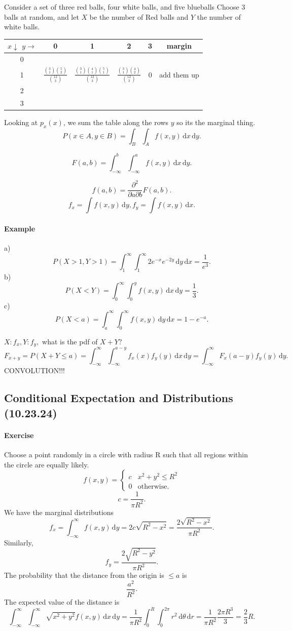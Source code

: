 \documentclass[12pt]{article}
\newcommand{\diffn}[1]{\,\mathrm{d}{#1}}
\begin{document}
Consider a set of three red balls, four white balls, and five blueballs
Choose 3 balls at random, and let
$X$ be the number of Red balls and $Y$ the number of white balls.

\begin{tabular}{c|c|c|c|c|c}
    $x\downarrow$ $y\rightarrow$& 0 & 1 & 2 & 3&margin  \\ \hline
     0 & & & &\\ \hline
     1 & $\frac{\binom{3}{1}\binom{5}{2}}{\binom{12}{3}}$&$\frac{\binom{3}{1}\binom{4}{1}\binom{5}{1}}{\binom{12}{3}}$&$\frac{\binom{3}{1}\binom{4}{2}}{\binom{12}{3}}$&0&add them up\\\hline
     2 & & & &\\ \hline
     3 & & & & \\ \hline
\end{tabular}

Looking at $p_x(x)$, we sum the table along the rows $y$ so its the marginal thing.
\[P(x\in A,y\in B)=\int_B\int_Af(x,y)\diffn{x}\diffn{y}.\]

\[F(a,b)=\int_{-\infty}^b\int_{-\infty}^a f(x,y)\diffn{x}\diffn{y}.\]

\[f(a,b)=\frac{\partial^2}{\partial a\partial b}F(a,b).\]
\[f_x=\int f(x,y)\diffn{y},f_y=\int f(x,y)\diffn{x}.\]
\paragraph{Example}
a) 
\[P(X>1,Y>1)=\int_1^\infty\int_1^\infty 2e^{-x}e^{-2y}\diffn{y}\diffn{x}=\frac{1}{e^3}.\]
b)
\[P(X<Y)=\int_0^\infty\int_0^yf(x,y)\diffn{x}\diffn{y}=\frac{1}{3}.\]
c)
\[P(X<a)=\int_a^\infty\int_0^\infty f(x,y)\diffn{y}\diffn{x}=1-e^{-a}.\]

$X:f_x,Y:f_y,$ what is the pdf of $X+Y?$
\[F_{x+y}=P(X+Y\le a)=\int_{-\infty}^\infty\int_{-\infty}^{a-y}f_x(x)f_y(y)\diffn{x}\diffn{y}=\int_{-\infty}^\infty F_x(a-y)f_y(y)\diffn{y}.\]
CONVOLUTION!!!


\subsection{Conditional Expectation and Distributions (10.23.24)}
\paragraph{Exercise}
Choose a point randomly in a circle with radius R such that all regions within the circle are equally likely.
\[f(x,y)=\begin{cases}
    c&x^2+y^2\le R^2\\
    0&\mathrm{otherwise}.
\end{cases}\]
\[c=\frac{1}{\pi R^2}.\]
We have the marginal distributions
\[f_x=\int_{-\infty}^\infty f(x,y)\diffn{y}=2c\sqrt{R^2-x^2}=\frac{2\sqrt{R^2-x^2}}{\pi R^2}.\] Similarly,
\[f_y=\frac{2\sqrt{R^2-y^2}}{\pi R^2}.\]
The probability that the distance from the origin is $\le a$ is
\[\frac{a^2}{R^2}.\]
The expected value of the distance is
\[\int_{-\infty}^\infty\int_{-\infty}^\infty \sqrt{x^2+y^2}f(x,y)\diffn{x}\diffn{y}=\frac{1}{\pi R^2}\int_0^R\int_0^{2\pi} r^2\diffn{\theta}\diffn{r}=\frac{1}{\pi R^2}\frac{2\pi R^3}{3}=\frac{2}{3}R.\]
\end{document}
